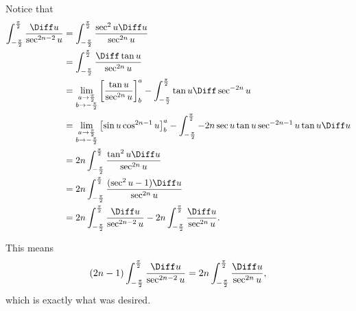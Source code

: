 \begin{enumerate}
          Notice that
          \begin{align*}
              \int_{- \frac{\pi}{2}}^{\frac{\pi}{2}} \frac{\Diff u}{\sec^{2n - 2} u} & = \int_{- \frac{\pi}{2}}^{\frac{\pi}{2}} \frac{\sec^2 u \Diff u}{\sec^{2n} u}                                                                        \\
                                                                                     & = \int_{- \frac{\pi}{2}}^{\frac{\pi}{2}} \frac{\Diff \tan u}{\sec^{2n} u}                                                                            \\
                                                                                     & = \lim_{\substack{a \to \frac{\pi}{2}                                                                                                                \\b \to -\frac{\pi}{2}}}\left[\frac{\tan u}{\sec^{2n}u}\right]^{a}_{b} - \int_{- \frac{\pi}{2}}^{\frac{\pi}{2}} \tan u \Diff \sec^{-2n}u\\
                                                                                     & = \lim_{\substack{a \to \frac{\pi}{2}                                                                                                                \\b \to -\frac{\pi}{2}}}\left[\sin u \cos^{2n - 1} u\right]^{a}_{b} - \int_{- \frac{\pi}{2}}^{\frac{\pi}{2}} -2n \sec u \tan u \sec^{-2n - 1}u \tan u \Diff u\\
                                                                                     & = 2n \int_{- \frac{\pi}{2}}^{\frac{\pi}{2}} \frac{\tan^2 u \Diff u}{\sec^{2n} u}                                                                     \\
                                                                                     & = 2n \int_{- \frac{\pi}{2}}^{\frac{\pi}{2}} \frac{(\sec^2 u - 1) \Diff u}{\sec^{2n} u}                                                               \\
                                                                                     & = 2n \int_{- \frac{\pi}{2}}^{\frac{\pi}{2}} \frac{\Diff u}{\sec^{2n - 2} u} - 2n \int_{- \frac{\pi}{2}}^{\frac{\pi}{2}} \frac{\Diff u}{\sec^{2n} u}. \\
          \end{align*}

          This means
          \[
              (2n - 1) \int_{- \frac{\pi}{2}}^{\frac{\pi}{2}} \frac{\Diff u}{\sec^{2n - 2} u} = 2n \int_{- \frac{\pi}{2}}^{\frac{\pi}{2}} \frac{\Diff u}{\sec^{2n} u},
          \]
          which is exactly what was desired.


\end{enumerate}
